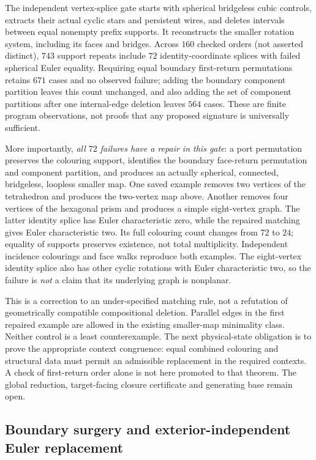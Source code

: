 The independent vertex-splice gate starts with spherical bridgeless cubic
controls, extracts their actual cyclic stars and persistent wires, and
deletes intervals between equal nonempty prefix supports. It reconstructs
the smaller rotation system, including its faces and bridges. Across $160$
checked orders (not asserted distinct), $743$ support repeats include $72$
identity-coordinate splices with failed spherical Euler equality. Requiring
equal boundary first-return permutations retains $671$ cases and no
observed failure; adding the boundary component partition leaves this
count unchanged, and also adding the set of component partitions after
one internal-edge deletion leaves $564$ cases. These are finite program
observations, not proofs that any proposed signature is universally
sufficient.

More importantly, \emph{all $72$ failures have a repair in this gate}:
a port permutation preserves the colouring support, identifies the
boundary face-return permutation and component partition, and produces
an actually spherical, connected, bridgeless, loopless smaller map.
One saved example removes two vertices of the tetrahedron and produces
the two-vertex map above. Another removes four vertices of the hexagonal
prism and produces a simple eight-vertex graph. The latter identity
splice has Euler characteristic zero, while the repaired matching gives
Euler characteristic two. Its full colouring count changes from $72$ to
$24$; equality of supports preserves existence, not total multiplicity.
Independent incidence colourings and face walks reproduce both examples.
The eight-vertex identity splice also has other cyclic rotations with
Euler characteristic two, so the failure is \emph{not} a claim that its
underlying graph is nonplanar.

This is a correction to an under-specified matching rule, not a refutation
of geometrically compatible compositional deletion. Parallel edges in
the first repaired example are allowed in the existing smaller-map
minimality class. Neither control is a least counterexample. The next
physical-state obligation is to prove the appropriate context congruence:
equal combined colouring and structural data must permit an admissible
replacement in the required contexts. A check of first-return order alone
is not here promoted to that theorem. The global reduction, target-facing
closure certificate and generating base remain open.

\subsection{Boundary surgery and exterior-independent Euler replacement}
\label{sec:boundary-rewire-euler}

